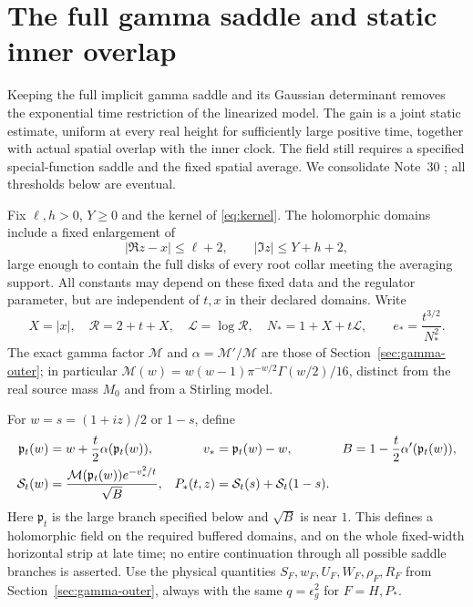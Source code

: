 \section{The full gamma saddle and static inner overlap}\label{sec:full-saddle}
Keeping the full implicit gamma saddle and its Gaussian determinant
removes the exponential time restriction of the linearized model.
The gain is a joint static estimate, uniform at every real height for
sufficiently large positive time, together with actual spatial overlap
with the inner clock. The field still requires a specified
special-function saddle and the fixed spatial average. We consolidate
Note~30 \cite{n30}; all thresholds below are eventual.

Fix $\ell,h>0$, $Y\ge0$ and the kernel of \eqref{eq:kernel}.
The holomorphic domains include a fixed enlargement of
\[
 |\Re z-x|\le\ell+2,\qquad |\Im z|\le Y+h+2,
\]
large enough to contain the full disks of every root collar meeting
the averaging support. All constants may depend on these fixed data
and the regulator parameter, but are independent of $t,x$ in their
declared domains. Write
\begin{equation}
 X=|x|,\quad \mathcal R=2+t+X,\quad \mathcal L=\log\mathcal R,
 \quad N_*=1+X+t\mathcal L,\qquad e_*=\frac{t^{3/2}}{N_*^2}.
 \label{eq:full-saddle-scales}
\end{equation}
The exact gamma factor $\mathcal M$ and $\alpha=\mathcal M'/\mathcal M$
are those of Section~\ref{sec:gamma-outer}; in particular
$\mathcal M(w)=w(w-1)\pi^{-w/2}\Gamma(w/2)/16$, distinct from
the real source mass $M_0$ and from a Stirling model.

For $w=s=(1+iz)/2$ or $1-s$, define
\begin{align}
 \mathfrak p_t(w)&=w+\frac t2\alpha(\mathfrak p_t(w)),&
 v_*&=\mathfrak p_t(w)-w,&
 B&=1-\frac t2\alpha'(\mathfrak p_t(w)),\notag\\
 \mathcal S_t(w)&=\frac{\mathcal M(\mathfrak p_t(w))e^{-v_*^2/t}}
                         {\sqrt B},&
 P_*(t,z)&=\mathcal S_t(s)+\mathcal S_t(1-s).
 \label{eq:full-saddle-model}
\end{align}
Here $\mathfrak p_t$ is the large branch specified below and $\sqrt B$
is near $1$. This defines a holomorphic field on the required buffered
domains, and on the whole fixed-width horizontal strip at late time;
no entire continuation through all possible saddle branches is asserted.
Use the physical quantities $S_F,w_F,U_F,W_F,\rho_F,R_F$ from
Section~\ref{sec:gamma-outer}, always with the same $q=\epsilon_g^2$
for $F=H,P_*$.

